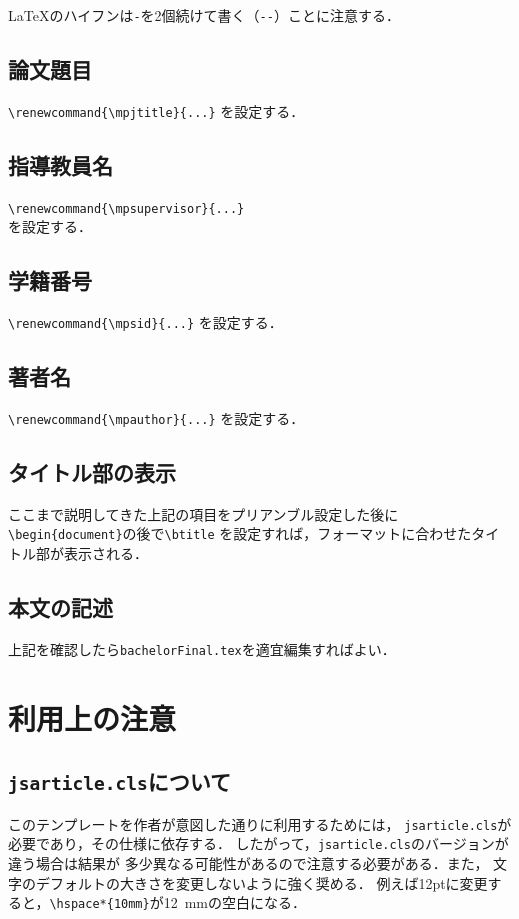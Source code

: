 \documentclass[onecolumn]{jsarticle}
\renewcommand{\mpjtitle}{
  卒業論文概要原稿用\LaTeXe テンプレート
}
\renewcommand{\mpsupervisor}{東京~太郎~教授，都市~次郎~准教授}
\renewcommand{\mpsid}{1081200}
\renewcommand{\mpauthor}{山田~遥斗}
\begin{document}
\LaTeX のハイフンは\verb+-+を2個続けて書く（\verb+--+）ことに注意する．

\subsection{論文題目}
\verb+\renewcommand{\mpjtitle}{...}+
を設定する．

\subsection{指導教員名}
\verb+\renewcommand{\mpsupervisor}{...}+ \\
を設定する．

\subsection{学籍番号}
\verb+\renewcommand{\mpsid}{...}+
を設定する．

\subsection{著者名}
\verb+\renewcommand{\mpauthor}{...}+
を設定する．

\subsection{タイトル部の表示}
ここまで説明してきた上記の項目をプリアンブル設定した後に
\verb+\begin{document}+の後で\verb+\btitle+
を設定すれば，フォーマットに合わせたタイトル部が表示される．

\subsection{本文の記述}
上記を確認したら\texttt{bachelorFinal.tex}を適宜編集すればよい．


\section{利用上の注意}

\subsection{\texttt{jsarticle.cls}について}
このテンプレートを作者が意図した通りに利用するためには，
\texttt{jsarticle.cls}\cite{Okumura2000}が必要であり，その仕様に依存する．
したがって，\texttt{jsarticle.cls}のバージョンが違う場合は結果が
多少異なる可能性があるので注意する必要がある．また，
文字のデフォルトの大きさを変更しないように強く奨める．
例えば12ptに変更すると，\verb+\hspace*{10mm}+が12~mmの空白になる．
\end{document}
